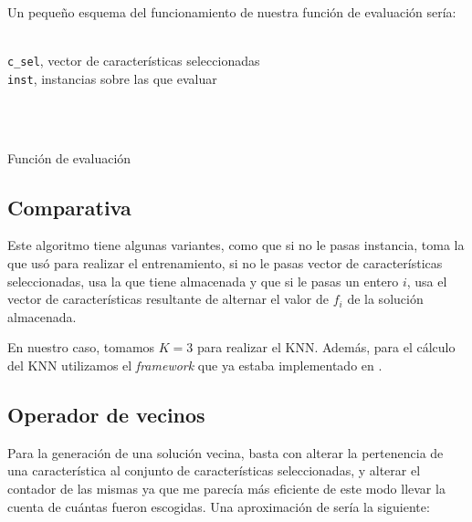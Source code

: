 \documentclass[a4paper, 11pt]{article}
\begin{document}
			Un pequeño esquema del funcionamiento de nuestra función de evaluación sería:

			\begin{algorithm}[H]
				\begin{algorithmic}[1]

					\REQUIRE \ \\
			        	\texttt{c\_sel}, vector de características seleccionadas\\
			        	\texttt{inst}, instancias sobre las que evaluar\\ \

			     	\\
						\ELSE
						\ENDIF
				  		
						\ENDIF
					\ENDFOR
				  
				\end{algorithmic}
			    \caption{Función de evaluación}
			    \label{Evaluate}

		\subsection{Comparativa}
			
			\end{algorithm}
			
			Este algoritmo tiene algunas variantes, como que si no le pasas instancia, toma la que
			usó para realizar el entrenamiento, si no le pasas vector de características seleccionadas,
			usa la que tiene almacenada y que si le pasas un entero $i$, usa el vector de características
			resultante de alternar el valor de $f_i$ de la solución almacenada.
			
			En nuestro caso, tomamos $K=3$ para realizar el KNN. Además, para el cálculo del KNN
			utilizamos el \textit{framework} que ya estaba implementado en \cite{KNN}.
		
		\subsection{Operador de vecinos}
			Para la generación de una solución vecina, basta con alterar la pertenencia de una
			característica al conjunto de características seleccionadas, y alterar el contador
			de las mismas ya que me parecía más eficiente de este modo llevar la cuenta de cuántas
			fueron escogidas. Una aproximación de sería la siguiente:
			
\end{document}
